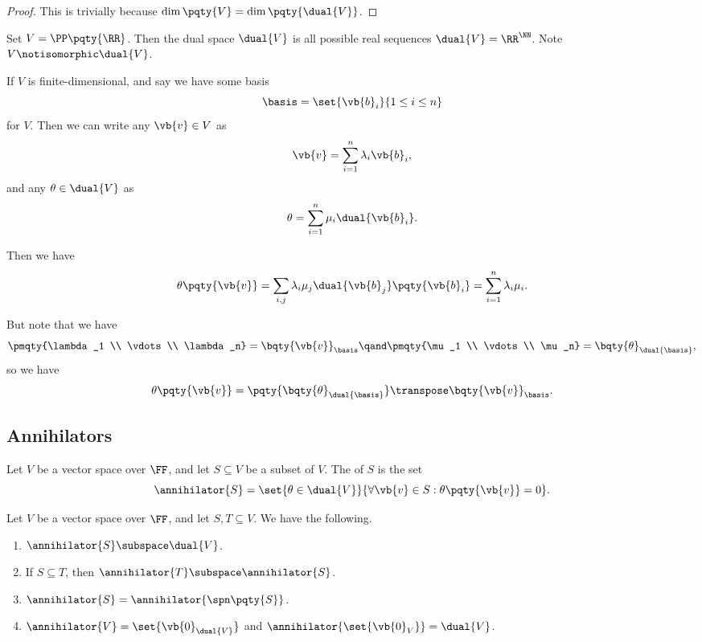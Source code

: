 \begin{proof}
    This is trivially because \(\dim \pqty{V} = \dim \pqty{\dual{V}}\).
\end{proof}

\begin{example}
    Set \(V = \PP\pqty{\RR}\). Then the dual space \(\dual{V}\) is all possible real sequences \(\dual{V} = \RR^{\NN}\). Note \(V \notisomorphic \dual{V}\).
\end{example}

\begin{remark}
    If \(V\) is finite-dimensional, and say we have some basis
    \[
        \basis = \set{\vb{b}_i}{1 \leq i \leq n}
    \]
    for \(V\). Then we can write any \(\vb{v} \in V\) as
    \[
        \vb{v} = \sum_{i=1}^n \lambda_i \vb{b}_i,
    \]
    and any \(\theta \in \dual{V}\) as
    \[
        \theta = \sum_{i=1}^n \mu_i \dual{\vb{b}_i}.
    \]

    Then we have
    \[
        \theta\pqty{\vb{v}} = \sum_{i, j} \lambda_i \mu_j \dual{\vb{b}_j}\pqty{\vb{b}_i} = \sum_{i = 1}^{n} \lambda_i \mu_i.
    \]

    But note that we have
    \[
        \pmqty{\lambda_1 \\ \vdots \\ \lambda_n} = \bqty{\vb{v}}_{\basis} \qand \pmqty{\mu_1 \\ \vdots \\ \mu_n} = \bqty{\theta}_{\dual{\basis}},
    \]
    so we have
    \[
        \theta\pqty{\vb{v}} = \pqty{\bqty{\theta}_{\dual{\basis}}}\transpose \bqty{\vb{v}}_{\basis}.
    \]
\end{remark}

\subsection{Annihilators}

\begin{definition}[Annihilator]
    Let \(V\) be a vector space over \(\FF\), and let \(S \subseteq V\) be a subset of \(V\). The  of \(S\) is the set
    \[
        \annihilator{S} = \set{\theta \in \dual{V}}{\forall \vb{v} \in S: \theta\pqty{\vb{v}} = 0}.
    \]
\end{definition}

\begin{lemma}
    \label{lem:annihilator-properties}%
    Let \(V\) be a vector space over \(\FF\), and let \(S, T \subseteq V\). We have the following.

    \begin{enumerate}[label=(\roman*)]
        \item \(\annihilator{S} \subspace \dual{V}\).
        \item If \(S \subseteq T\), then \(\annihilator{T} \subspace \annihilator{S}\).
        \item \(\annihilator{S} = \annihilator{\spn\pqty{S}}\).
        \item \(\annihilator{V} = \set{\vb{0}_{\dual{V}}}\) and \(\annihilator{\set{\vb{0}_V}} = \dual{V}\).
    \end{enumerate}
\end{lemma}


